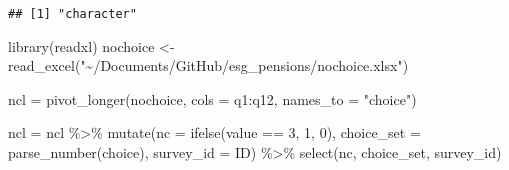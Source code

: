 \documentclass[
]{article}
\newenvironment{Shaded}{\begin{snugshade}}{\end{snugshade}}
\newcommand{\AttributeTok}[1]{\textcolor[rgb]{0.77,0.63,0.00}{#1}}
\newcommand{\CommentTok}[1]{\textcolor[rgb]{0.56,0.35,0.01}{\textit{#1}}}
\newcommand{\DecValTok}[1]{\textcolor[rgb]{0.00,0.00,0.81}{#1}}
\newcommand{\FunctionTok}[1]{\textcolor[rgb]{0.00,0.00,0.00}{#1}}
\newcommand{\NormalTok}[1]{#1}
\newcommand{\OtherTok}[1]{\textcolor[rgb]{0.56,0.35,0.01}{#1}}
\newcommand{\SpecialCharTok}[1]{\textcolor[rgb]{0.00,0.00,0.00}{#1}}
\newcommand{\StringTok}[1]{\textcolor[rgb]{0.31,0.60,0.02}{#1}}
\begin{document}
\begin{Shaded}
\end{Shaded}

\begin{verbatim}
## [1] "character"
\end{verbatim}

\begin{Shaded}
\end{Shaded}

\begin{Shaded}
\begin{Highlighting}[]
\FunctionTok{library}\NormalTok{(readxl)}
\NormalTok{nochoice }\OtherTok{\textless{}{-}} \FunctionTok{read\_excel}\NormalTok{(}\StringTok{"\textasciitilde{}/Documents/GitHub/esg\_pensions/nochoice.xlsx"}\NormalTok{)}
\end{Highlighting}
\end{Shaded}

\begin{Shaded}
\begin{Highlighting}[]
\NormalTok{ncl }\OtherTok{=} \FunctionTok{pivot\_longer}\NormalTok{(nochoice, }\AttributeTok{cols =}\NormalTok{ q1}\SpecialCharTok{:}\NormalTok{q12, }\AttributeTok{names\_to =} \StringTok{"choice"}\NormalTok{)}

\NormalTok{ncl }\OtherTok{=}\NormalTok{ ncl }\SpecialCharTok{\%\textgreater{}\%} 
  \FunctionTok{mutate}\NormalTok{(}\AttributeTok{nc =} \FunctionTok{ifelse}\NormalTok{(value }\SpecialCharTok{==} \DecValTok{3}\NormalTok{, }\DecValTok{1}\NormalTok{, }\DecValTok{0}\NormalTok{),}
         \AttributeTok{choice\_set =} \FunctionTok{parse\_number}\NormalTok{(choice),}
         \AttributeTok{survey\_id =}\NormalTok{ ID) }\SpecialCharTok{\%\textgreater{}\%} 
  \FunctionTok{select}\NormalTok{(nc, choice\_set, survey\_id)}
\end{Highlighting}
\end{Shaded}
\end{document}
